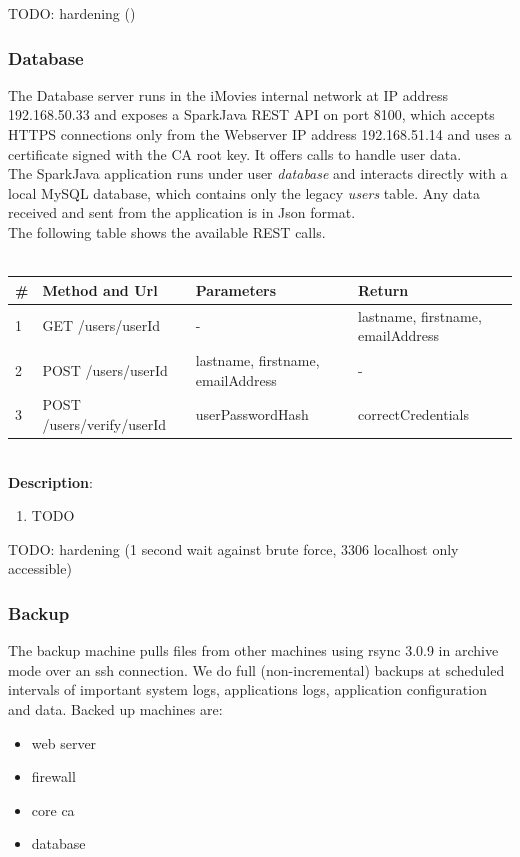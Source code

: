 \documentclass[english]{article}
\begin{document}
TODO: hardening ()

\subsubsection{Database}
The Database server runs in the iMovies internal network at IP address 192.168.50.33 and exposes a SparkJava REST API on port 8100, which accepts HTTPS connections only from the Webserver IP address 192.168.51.14 and uses a certificate signed with the CA root key. It offers calls to handle user data.\\
The SparkJava application runs under user \emph{database} and interacts directly with a local MySQL database, which contains only the legacy \emph{users} table. Any data received and sent from the application is in Json format.\\
The following table shows the available REST calls.\\
\\
\begin{tabular} {| p{} | p{} | p{} | p{} |}
\hline
\textbf{\#} & \textbf{Method and Url} & \textbf{Parameters} & \textbf{Return}\\
\hline
1 & GET /users/userId & - & lastname, firstname, emailAddress\\
\hline
2 & POST /users/userId & lastname, firstname, emailAddress & -\\
\hline
3 & POST /users/verify/userId & userPasswordHash & correctCredentials\\
\hline
\end{tabular}
\\
\textbf{Description}:
\begin{enumerate}
\item TODO
\end{enumerate}

TODO: hardening (1 second wait against brute force, 3306 localhost only accessible)

\subsubsection{Backup}

The backup machine pulls files from other machines using rsync 3.0.9 in archive mode over an ssh connection. We do full (non-incremental) backups at scheduled intervals of important system logs, applications logs, application configuration and data. Backed up machines are:

\begin{itemize}
    \item web server
    \item firewall
    \item core ca
    \item database
\end{itemize}
\end{document}
